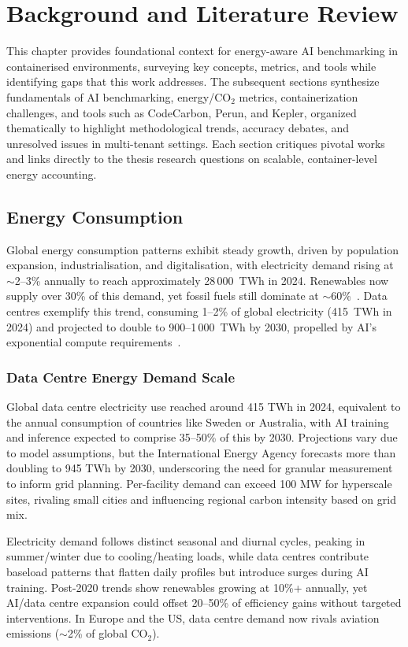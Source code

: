 \chapter{Background and Literature Review}
This chapter provides foundational context for energy-aware AI benchmarking 
in containerised environments, surveying key concepts, metrics, and tools while 
identifying gaps that this work addresses. The subsequent sections synthesize 
fundamentals of AI benchmarking, energy/CO$_2$ metrics, containerization 
challenges, and tools such as CodeCarbon, Perun, and Kepler, organized 
thematically to highlight methodological trends, accuracy debates, and 
unresolved issues in multi-tenant settings.  
Each section critiques pivotal works and links directly to the thesis research 
questions on scalable, container-level energy accounting.

\section{Energy Consumption}
Global energy consumption patterns exhibit steady growth, driven by population expansion, 
industrialisation, and digitalisation, with electricity demand rising at $\sim$2--3\% 
annually to reach approximately 28\,000~TWh in 2024.
Renewables now supply over 30\% of this demand, yet fossil fuels still dominate at 
$\sim$60\%~\cite{IEA4E2025}. Data centres exemplify this trend, consuming 1--2\% of 
global electricity (415~TWh in 2024) and projected to double to 900--1\,000~TWh by 2030, 
propelled by AI's exponential compute requirements~\cite{Wuerzburg2025}\cite{arXiv2509_07218}.

\subsection{Data Centre Energy Demand Scale}
Global data centre electricity use reached around 415 TWh in 2024, equivalent to 
the annual consumption of countries like Sweden or Australia, with AI 
training and inference expected to comprise 35--50\% of this by 2030. 
Projections vary due to model assumptions, but the International Energy Agency 
forecasts more than doubling to 945 TWh by 2030, underscoring the need for 
granular measurement to inform grid planning. Per-facility demand can exceed 
100 MW for hyperscale sites, rivaling small cities and influencing regional 
carbon intensity based on grid mix.

Electricity demand follows distinct seasonal and diurnal cycles, peaking in 
summer/winter due to cooling/heating loads, while data centres contribute 
baseload patterns that flatten daily profiles but introduce surges during 
AI training. Post-2020 trends show 
renewables growing at 10\%+ annually, yet AI/data centre expansion could 
offset 20--50\% of efficiency gains without targeted interventions. 
In Europe and the US, data centre demand now rivals aviation emissions 
($\sim$2\% of global CO$_2$).

